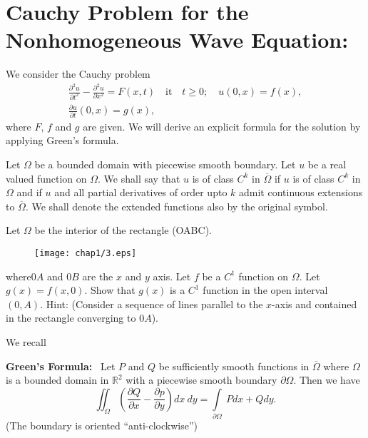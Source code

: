 \section{Cauchy Problem for the Nonhomogeneous Wave Equation:}

We consider the Cauchy problem
\begin{gather*}
\frac{\partial^{2}u}{\partial t^{2}}-\frac{\partial^{2}u}{\partial x^{2}}=F(x,t)\quad\text{it}\quad t\geq 0;\quad u(0,x)=f(x),\\[4pt]
\frac{\partial u}{\partial t}(0,x)=g(x),
\end{gather*}
where $F$, $f$ and $g$ are given. We will derive an explicit formula for the solution by applying Green's formula.

Let $\Omega$ be a bounded domain with piecewise smooth boundary. Let $u$ be a real valued function on $\Omega$. We shall say that $u$ is of class $C^{k}$ in $\overline{\Omega}$ if $u$ is of class $C^{k}$ in $\Omega$ and if $u$ and all partial derivatives of order upto $k$ admit continuous extensions to $\overline{\Omega}$. We shall denote the extended functions also by the original symbol.

\begin{exer*}
Let $\Omega$ be the interior of the rectangle (OABC).
\begin{figure}[H]
\centering
\texttt{[image: chap1/3.eps]}
\end{figure}
\noindent
where\pageoriginale $0A$ and $0B$ are the $x$ and $y$ axis. Let $f$ be a $C^{1}$ function on $\Omega$. Let $g(x)=f(x,0)$. Show that $g(x)$ is a $C^{1}$ function in the open interval $(0,A)$. Hint: (Consider a sequence of lines parallel to the $x$-axis and contained in the rectangle converging to $0A$).
\end{exer*}

We recall

\medskip
\noindent
{\bf Green's Formula:}~ Let $P$ and $Q$ be sufficiently smooth functions in $\overline{\Omega}$ where $\Omega$ is a bounded domain in $\mathbb{R}^{2}$ with a piecewise smooth boundary $\partial \Omega$. Then we have
$$
\iint_{\Omega}\left(\frac{\partial Q}{\partial x}-\frac{\partial p}{\partial y}\right)dx \ dy =\int\limits_{\partial \Omega}\ Pdx +Qdy.
$$
(The boundary is oriented ``anti-clockwise'')

